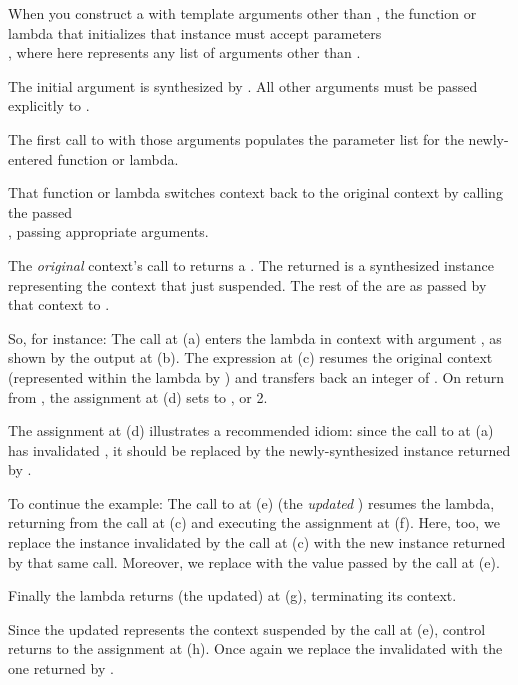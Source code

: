 When you construct a \ectx with template arguments other than , the
function or lambda that initializes that instance must accept parameters\\
, where  here
represents any list of arguments other than .

The initial \ectx argument is synthesized by \op. All other arguments must be
passed explicitly to \op.

The first call to \op with those arguments populates the parameter list for
the newly-entered function or lambda.

That function or lambda switches context back to the original context by
calling the passed\\
\ectxop, passing appropriate arguments.

The \emph{original} context's call to \op returns
a . The
returned \ectx is a synthesized instance representing the context that just
suspended. The rest of the  are as passed by that context to \op.

So, for instance:
The  call at (a) enters the lambda in context  with
argument , as shown by the output at (b). The
expression  at (c) resumes the original context (represented
within the lambda by ) and transfers back an integer of .
On return from , the assignment at (d) sets  to ,
or 2.

The assignment at (d) illustrates a recommended idiom: since the call to \op
at (a) has invalidated , it should be replaced by the
newly-synthesized \ectx instance returned by \op.

To continue the example:
The call to  at (e) (the \emph{updated} ) resumes
the  lambda, returning from the  call at (c) and
executing the assignment at (f). Here, too, we replace the \ectx
instance  invalidated by the \op call at (c) with the new instance
returned by that same \op call. Moreover, we replace  with the value
passed by the call at (e).

Finally the lambda returns (the updated)  at (g), terminating its
context.

Since the updated  represents the context suspended by the call at
(e), control returns to the assignment at (h). Once again we replace the
invalidated  with the one returned by \op.

